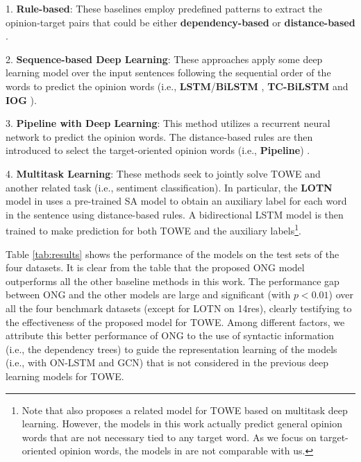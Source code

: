 \documentclass[11pt,a4paper]{article}
\begin{document}
    1. \textbf{Rule-based}: These baselines employ predefined patterns to extract the opinion-target pairs that could be either {\bf dependency-based} \citep{zhuang2006movie} or {\bf distance-based} \citep{hu2004mining}.


    2. \textbf{Sequence-based Deep Learning}: These approaches apply some deep learning model over the input sentences following the sequential order of the words to predict the opinion words (i.e., {\bf LSTM}/{\bf BiLSTM} \citep{liu2015fine}, {\bf TC-BiLSTM} \citep{fan2019target} and {\bf IOG} \citep{fan2019target}).


    3. \textbf{Pipeline with Deep Learning}: This method utilizes a recurrent neural network to predict the opinion words. The distance-based rules are then introduced to select the target-oriented opinion words (i.e., {\bf Pipeline}) \cite{fan2019target}.


    4. \textbf{Multitask Learning}: These methods seek to jointly solve TOWE and another related task (i.e., sentiment classification). In particular, the {\bf LOTN} model in \cite{wu2020latent} uses a pre-trained SA model to obtain an auxiliary label for each word in the sentence using distance-based rules. A bidirectional LSTM model is then trained to make prediction for both TOWE and the auxiliary labels\footnote{Note that \citep{peng2019knowing} also proposes a related model for TOWE based on multitask deep learning. However, the models in this work actually predict general opinion words that are not necessary tied to any target word. As we focus on target-oriented opinion words, the models in \citep{peng2019knowing} are not comparable with us.}.
    








Table \ref{tab:results} shows the performance of the models on the test sets of the four datasets. It is clear from the table that the proposed ONG model outperforms all the other baseline methods in this work. The performance gap between ONG and the other models are large and significant (with $p < 0.01$) over all the four benchmark datasets (except for LOTN on 14res), clearly testifying to the effectiveness of the proposed model for TOWE. Among different factors, we attribute this better performance of ONG to the use of syntactic information (i.e., the dependency trees) to guide the representation learning of the models (i.e., with ON-LSTM and GCN) that is not considered in the previous deep learning models for TOWE.
\end{document}
